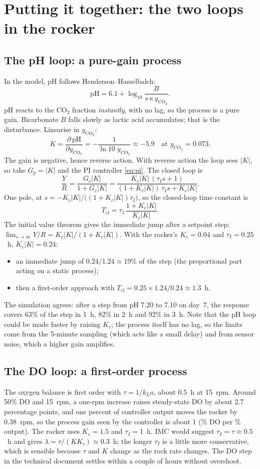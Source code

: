 \documentclass[11pt,a4paper]{article}
\begin{document}
\section{Putting it together: the two loops in the rocker}
\label{sec:rocker}

\subsection{The pH loop: a pure-gain process}
In the model, pH follows Henderson--Hasselbalch:
\[
  \mathrm{pH} = 6.1 + \log_{10}\frac{B}{s\,\kappa\,y_{\mathrm{CO_2}}}.
\]
pH reacts to the CO$_2$ fraction \emph{instantly}, with no lag, so the process is a pure gain. Bicarbonate
$B$ falls slowly as lactic acid accumulates; that is the disturbance. Linearise in $y_{\mathrm{CO_2}}$:
\[
  K = \frac{\partial\,\mathrm{pH}}{\partial y_{\mathrm{CO_2}}} = -\frac{1}{\ln 10 \; y_{\mathrm{CO_2}}}
  \approx -5.9 \quad \text{at } y_{\mathrm{CO_2}} = 0.073 .
\]
The gain is negative, hence reverse action. With reverse action the loop sees $|K|$, so take
$G_p = |K|$ and the PI controller \eqref{eq:pi}. The closed loop is
\[
  \frac{Y}{R} = \frac{G_c |K|}{1 + G_c |K|}
  = \frac{K_c|K|\,(\tau_I s + 1)}{(1 + K_c|K|)\,\tau_I s + K_c|K|}.
\]
One pole, at $s = -K_c|K| / \bigl((1+K_c|K|)\tau_I\bigr)$, so the closed-loop time constant is
\[
  T_{\mathrm{cl}} = \tau_I\,\frac{1 + K_c|K|}{K_c|K|}.
\]
The initial value theorem gives the immediate jump after a setpoint step:
$\lim_{s\to\infty} Y/R = K_c|K|/(1 + K_c|K|)$. With the rocker's $K_c = 0.04$ and $\tau_I = 0.25$~h,
$K_c|K| = 0.24$:
\begin{itemize}
  \item an immediate jump of $0.24/1.24 \approx 19\%$ of the step (the proportional part acting on a static process);
  \item then a first-order approach with $T_{\mathrm{cl}} = 0.25 \times 1.24/0.24 \approx 1.3$~h.
\end{itemize}
The simulation agrees: after a step from pH 7.20 to 7.10 on day~7, the response covers 63\% of the step in
1~h, 82\% in 2~h and 92\% in 3~h. Note that the pH loop could be made faster by raising $K_c$; the process
itself has no lag, so the limits come from the 5-minute sampling (which acts like a small delay) and
from sensor noise, which a higher gain amplifies.

\subsection{The DO loop: a first-order process}
The oxygen balance is first order with $\tau = 1/k_La$, about 0.5~h at 15~rpm. Around 50\% DO and
15~rpm, a one-rpm increase raises steady-state DO by about 2.7 percentage points, and one percent of
controller output moves the rocker by 0.38~rpm, so the process gain seen by the controller is about 1
(\% DO per \% output). The rocker uses $K_c = 1.5$ and $\tau_I = 1$~h. IMC would suggest $\tau_I = \tau
\approx 0.5$~h and gives $\lambda = \tau/(K K_c) \approx 0.3$~h; the longer $\tau_I$ is a little more
conservative, which is sensible because $\tau$ and $K$ change as the rock rate changes. The DO step in the
technical document settles within a couple of hours without overshoot.
\end{document}
